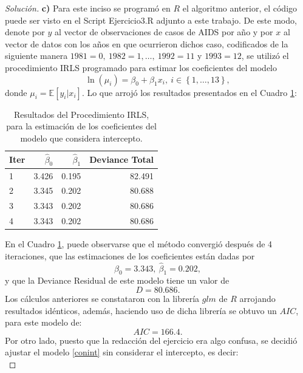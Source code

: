 \documentclass[10.5pt,notitlepage]{article}
\newenvironment{solucion}
  {\begin{proof}[Solución]}
  {\end{proof}}
\newcommand{\EE}{\mathbb{E}}
\newcommand{\kis}[1]{\left\{ #1 \right\}}
\theoremstyle{plain}
\begin{document}
\begin{solucion}
\noindent\textbf{c)} Para este inciso se programó en \(R\) el algoritmo anterior, el código puede ser visto en el Script Ejercicio3.R adjunto a este trabajo. De este modo, denote por \(y\) al vector de observaciones de casos de AIDS por año y por \(x\) al vector de datos con los años en que ocurrieron dichos caso, codificados de la siguiente manera \(1981 = 0, \ 1982 = 1, \hdots, \ 1992=11\) y \(  1993 = 12\), se utilizó el procedimiento IRLS programado para estimar los coeficientes del modelo
\begin{equation}\label{conint}
  \ln(\mu_i) = \beta_0 + \beta_1 x_i, \ i\in \kis{1, \hdots, 13},  
\end{equation}
donde \(\mu_i = \EE[y_i | x_i]\). Lo que arrojó los resultados presentados en el Cuadro \ref{tab:ref1}: 
\begin{table}[H]
        \centering
        \begin{tabular}{@{}l@{\hskip 0.3in}r@{\hskip 0.3in}r@{\hskip 0.3in}r@{}}
            \toprule
            Iter&\(\hat{\beta}_0\)  & \(\hat{\beta}_1\)& Deviance Total \\
            \midrule
                1 &3.426& 0.195& 82.491\\ 
                2 &3.345& 0.202& 80.688\\
                3 &3.343& 0.202& 80.686\\ 
                4 &3.343& 0.202& 80.686\\
            \bottomrule
        \end{tabular}
        \caption{Resultados del Procedimiento IRLS, para la estimación de los coeficientes del modelo que considera intercepto.}
        \label{tab:ref1}
\end{table}
En el Cuadro \ref{tab:ref1}, puede observarse que el método convergió después de 4 iteraciones, que las estimaciones de los coeficientes están dadas por 
\[
\hat{\beta}_0 =3.343, \  \hat{\beta}_1 = 0.202, 
\] 
y que la Deviance Residual de este modelo tiene un valor de 
\[
D = 80.686.
\]
Los cálculos anteriores se constataron con la librería \(glm\) de \(R\) arrojando resultados idénticos, además, haciendo uso de dicha librería se obtuvo un \(AIC\), para este modelo de: 
\begin{equation}\label{AIC.Mod1}
AIC  = 166.4.     
\end{equation}
Por otro lado, puesto que la redacción del ejercicio era algo confusa, se decidió ajustar el modelo \eqref{conint} sin considerar el intercepto, es decir: 
\begin{equation}\label{sinint}

\end{equation}
\end{solucion}
\end{document}
